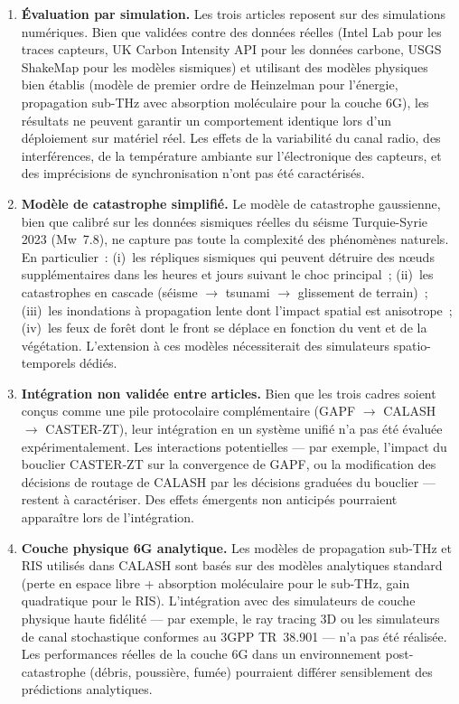 \begin{enumerate}
    \item \textbf{Évaluation par simulation.} Les trois articles reposent sur des simulations numériques. Bien que validées contre des données réelles (Intel Lab pour les traces capteurs, UK Carbon Intensity API pour les données carbone, USGS ShakeMap pour les modèles sismiques) et utilisant des modèles physiques bien établis (modèle de premier ordre de Heinzelman \cite{heinzelman2000leach} pour l'énergie, propagation sub-THz avec absorption moléculaire pour la couche 6G), les résultats ne peuvent garantir un comportement identique lors d'un déploiement sur matériel réel. Les effets de la variabilité du canal radio, des interférences, de la température ambiante sur l'électronique des capteurs, et des imprécisions de synchronisation n'ont pas été caractérisés.

    \item \textbf{Modèle de catastrophe simplifié.} Le modèle de catastrophe gaussienne, bien que calibré sur les données sismiques réelles du séisme Turquie-Syrie 2023 (Mw~7.8), ne capture pas toute la complexité des phénomènes naturels. En particulier~: (i)~les répliques sismiques qui peuvent détruire des n\oe{}uds supplémentaires dans les heures et jours suivant le choc principal~; (ii)~les catastrophes en cascade (séisme $\to$ tsunami $\to$ glissement de terrain)~; (iii)~les inondations à propagation lente dont l'impact spatial est anisotrope~; (iv)~les feux de forêt dont le front se déplace en fonction du vent et de la végétation. L'extension à ces modèles nécessiterait des simulateurs spatio-temporels dédiés.

    \item \textbf{Intégration non validée entre articles.} Bien que les trois cadres soient conçus comme une pile protocolaire complémentaire (GAPF $\to$ CALASH $\to$ CASTER-ZT), leur intégration en un système unifié n'a pas été évaluée expérimentalement. Les interactions potentielles --- par exemple, l'impact du bouclier CASTER-ZT sur la convergence de GAPF, ou la modification des décisions de routage de CALASH par les décisions graduées du bouclier --- restent à caractériser. Des effets émergents non anticipés pourraient apparaître lors de l'intégration.

    \item \textbf{Couche physique 6G analytique.} Les modèles de propagation sub-THz et RIS utilisés dans CALASH sont basés sur des modèles analytiques standard (perte en espace libre + absorption moléculaire pour le sub-THz, gain quadratique pour le RIS). L'intégration avec des simulateurs de couche physique haute fidélité --- par exemple, le ray tracing 3D ou les simulateurs de canal stochastique conformes au 3GPP TR~38.901 --- n'a pas été réalisée. Les performances réelles de la couche 6G dans un environnement post-catastrophe (débris, poussière, fumée) pourraient différer sensiblement des prédictions analytiques.


\end{enumerate}
